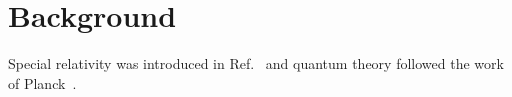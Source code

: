 \documentclass{article}
\begin{document}
\section{Background}
Special relativity was introduced in Ref.~\cite{einstein1905} and quantum theory
followed the work of Planck~\cite{planck1901}.


\end{document}
